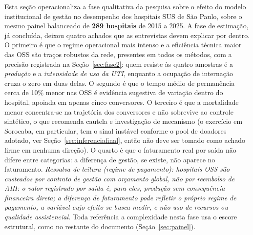 Esta seção operacionaliza a fase qualitativa da pesquisa sobre o efeito
do modelo institucional de gestão no desempenho dos hospitais SUS de São
Paulo, sobre o mesmo painel balanceado de \textbf{289 hospitais} de 2015
a 2025. A fase de estimação, já
concluída, deixou quatro achados que as entrevistas devem explicar por
dentro. O primeiro é que o regime operacional mais intenso e a
eficiência técnica maior das OSS são traços robustos da rede, presentes
em todos os métodos, com a precisão registrada na
Seção~\ref{sec:fase2}: quem resiste às quatro amostras é a
\emph{produção} e a \emph{intensidade de uso da UTI}, enquanto a
ocupação de internação cruza o zero em duas delas. O segundo é que o
tempo médio de permanência cerca
de 10\% menor nas OSS é evidência sugestiva de variação dentro do
hospital, apoiada em apenas cinco conversores. O terceiro é que a
mortalidade menor concentra-se na trajetória dos conversores e não
sobrevive ao controle sintético, o que recomenda cautela e investigação
de mecanismo (o exercício em Sorocaba, em particular, tem o sinal
instável conforme o pool de doadores adotado, ver
Seção~\ref{sec:inferenciafinal}, então não deve ser tomado como
achado firme em nenhuma direção). O quarto é que o faturamento real por
saída não difere entre categorias: a diferença de gestão, se existe, não
aparece no faturamento. \textit{Ressalva de leitura (regime de
pagamento): hospitais OSS são custeados por contrato de gestão com
orçamento global, não por reembolso de AIH: o valor registrado por
saída é, para eles, produção sem consequência financeira direta; a
diferença de faturamento pode refletir o próprio regime de pagamento, a
variável cujo efeito se busca medir, e não uso de recursos ou qualidade
assistencial.} Toda referência a complexidade nesta fase usa o escore
estrutural, como no restante do documento (Seção~\ref{sec:painel}).

